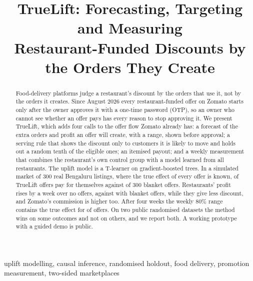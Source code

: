 \documentclass[conference]{IEEEtran}
\begin{document}
\title{TrueLift: Forecasting, Targeting and Measuring\\Restaurant-Funded Discounts by the Orders They Create}

\author{
}

\maketitle

\begin{abstract}
Food-delivery platforms judge a restaurant's discount by the orders that use it, not by the orders it
creates. Since August 2026 every restaurant-funded offer on Zomato starts only after the owner approves
it with a one-time password (OTP), so an owner who cannot see whether an offer pays has every reason to
stop approving it. We present TrueLift, which adds four calls to the offer flow Zomato already has: a
forecast of the extra orders and profit an offer will create, with a range, shown before approval; a
serving rule that shows the discount only to customers it is likely to move and holds out a random
tenth of the eligible ones; an itemised payout; and a weekly measurement that combines the
restaurant's own control group with a model learned from all restaurants. The uplift model is a
T-learner on gradient-boosted trees. In a simulated market of 300 real Bengaluru listings, where the
true effect of every offer is known,  of  TrueLift offers pay for themselves
against  of 300 blanket offers. Restaurants' profit rises by  a week over
no offers, against  with blanket offers, while they give 
less discount, and Zomato's commission is higher too. After four weeks the weekly 80\% range contains the true effect for
 of offers. On two public randomised datasets the method wins on some outcomes and not
on others, and we report both. A working prototype with a guided demo is public.
\end{abstract}

\begin{IEEEkeywords}
uplift modelling, causal inference, randomised holdout, food delivery, promotion measurement,
two-sided marketplaces
\end{IEEEkeywords}
\end{document}
